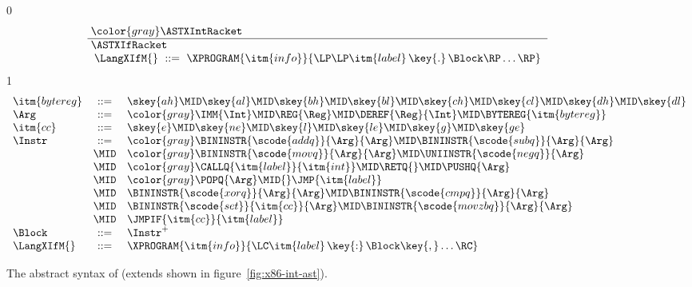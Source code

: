 \documentclass[7x10]{TimesAPriori_MIT}%
\newcommand{\gray}[1]{{\color{gray} #1}}
\def\racketEd{0}
\def\pythonEd{1}
\def\edition{1}
\newcommand{\racket}[1]{{\if\edition\racketEd{#1}\fi}}
\newcommand{\pythonColor}[0]{}
\newcommand{\python}[1]{{\if\edition\pythonEd\pythonColor #1\fi}}
\numberwithin{theorem}{chapter}
\numberwithin{definition}{chapter}
\numberwithin{equation}{chapter}
\begin{document}
\begin{figure}[tp]
\begin{tcolorbox}[colback=white]
\small    
{\if\edition\racketEd    
\[\arraycolsep=3pt
\begin{array}{l}
  \gray{\ASTXIntRacket} \\ \hline
  \ASTXIfRacket \\
\begin{array}{lcl}
\LangXIfM{} &::= & \XPROGRAM{\itm{info}}{\LP\LP\itm{label} \,\key{.}\, \Block \RP\ldots\RP}
\end{array}
\end{array}
\]
\fi}
%
{\if\edition\pythonEd\pythonColor
\[
\begin{array}{lcl}
\itm{bytereg} &::=& \skey{ah} \MID \skey{al} \MID \skey{bh} \MID \skey{bl}
    \MID \skey{ch} \MID \skey{cl} \MID \skey{dh} \MID \skey{dl} \\
\Arg &::=&  \gray{\IMM{\Int} \MID \REG{\Reg} \MID \DEREF{\Reg}{\Int}} 
     \MID \BYTEREG{\itm{bytereg}} \\
\itm{cc} & ::= & \skey{e} \MID \skey{ne} \MID \skey{l} \MID \skey{le} \MID \skey{g} \MID \skey{ge} \\
\Instr &::=& \gray{ \BININSTR{\scode{addq}}{\Arg}{\Arg} 
       \MID \BININSTR{\scode{subq}}{\Arg}{\Arg} } \\
       &\MID& \gray{ \BININSTR{\scode{movq}}{\Arg}{\Arg} 
       \MID \UNIINSTR{\scode{negq}}{\Arg} } \\
       &\MID& \gray{ \CALLQ{\itm{label}}{\itm{int}} \MID \RETQ{} 
       \MID \PUSHQ{\Arg}} \\
       &\MID& \gray{ \POPQ{\Arg} \MID \racket{\JMP{\itm{label}}} } \python{\JMP{\itm{label}}}\\
       &\MID& \BININSTR{\scode{xorq}}{\Arg}{\Arg}
       \MID \BININSTR{\scode{cmpq}}{\Arg}{\Arg}\\
       &\MID& \BININSTR{\scode{set}}{\itm{cc}}{\Arg} 
       \MID \BININSTR{\scode{movzbq}}{\Arg}{\Arg}\\
       &\MID&  \JMPIF{\itm{cc}}{\itm{label}} \\
\Block &::= & \Instr^{+} \\
\LangXIfM{} &::= & \XPROGRAM{\itm{info}}{\LC\itm{label} \,\key{:}\, \Block \key{,} \ldots \RC }
\end{array}
\]
\fi}
\end{tcolorbox}
\caption{The abstract syntax of \LangXIf{} (extends \LangXInt{} shown in figure~\ref{fig:x86-int-ast}).}
\label{fig:x86-1}
\end{figure}
\end{document}
